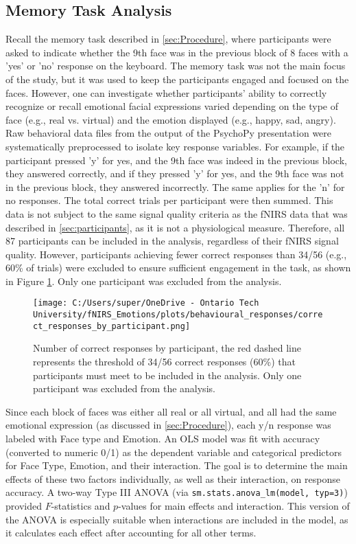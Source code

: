 \subsection{Memory Task Analysis}
\label{sec:memory_task_analysis}
Recall the memory task described in \ref{sec:Procedure}, where participants were asked to indicate whether the 9th face was in the previous block of 8 faces with a 'yes' or 'no' response on the keyboard.
The memory task was not the main focus of the study, but it was used to keep the participants engaged and focused on the faces. 
However, one can investigate whether participants' ability to correctly recognize or recall emotional facial expressions varied depending on the type of face (e.g., real vs. virtual) and the emotion displayed (e.g., happy, sad, angry). 
Raw behavioral data files from the output of the PsychoPy presentation were systematically preprocessed to isolate key response variables. 
For example, if the participant pressed 'y' for yes, and the 9th face was indeed in the previous block, they answered correctly, and if they pressed 'y' for yes, and the 9th face was not in the previous block, they answered incorrectly. 
The same applies for the 'n' for no responses. 
The total correct trials per participant were then summed. 
This data is not subject to the same signal quality criteria as the fNIRS data that was described in \ref{sec:participants}, as it is not a physiological measure. 
Therefore, all 87 participants can be included in the analysis, regardless of their fNIRS signal quality.
However, participants achieving fewer correct responses than 34/56 (e.g., 60\% of trials) were excluded to ensure sufficient engagement in the task, as shown in Figure \ref{fig:correct_responses}.
Only one participant was excluded from the analysis.

\begin{figure}[H]
    \centering
    \texttt{[image: C:/Users/super/OneDrive - Ontario Tech University/fNIRS\_Emotions/plots/behavioural\_responses/correct\_responses\_by\_participant.png]}
    \caption[Correct responses by participant]{Number of correct responses by participant, the red dashed line represents the threshold of 34/56 correct responses (60\%) that participants must meet to be included in the analysis.
    Only one participant was excluded from the analysis. }
    \label{fig:correct_responses}
\end{figure}

Since each block of faces was either all real or all virtual, and all had the same emotional expression (as discussed in \ref{sec:Procedure}), each y/n response was labeled with Face type and Emotion.
An OLS model was fit with accuracy (converted to numeric 0/1) as the dependent variable and categorical predictors for Face Type, Emotion, and their interaction. 
The goal is to determine the main effects of these two factors individually, as well as their interaction, on response accuracy.
A two-way Type III ANOVA (via \texttt{sm.stats.anova\_lm(model, typ=3)}) provided $F$-statistics and $p$-values for main effects and interaction.
This version of the ANOVA is especially suitable when interactions are included in the model, as it calculates each effect after accounting for all other terms.